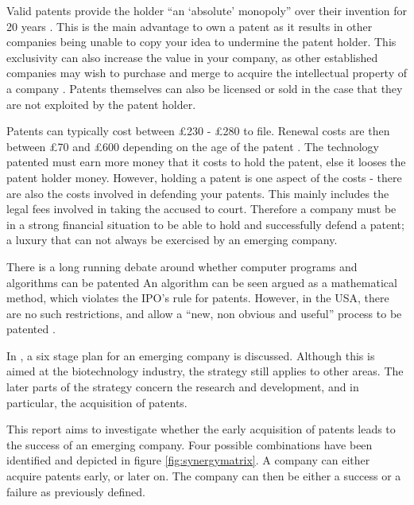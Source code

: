
Valid patents provide the holder ``an `absolute' monopoly'' over their invention for 20 years \cite{waelde2013contemporary}.
This is the main advantage to own a patent as it results in other companies being unable to copy your idea to undermine the patent holder.
This exclusivity can also increase the value in your company, as other established companies may wish to purchase and merge to acquire the intellectual property of a company \cite{NEEDED}. 
Patents themselves can also be licensed or sold in the case that they are not exploited by the patent holder. 

Patents can typically cost between \pounds 230 - \pounds 280 to file. 
Renewal costs are then between \pounds 70 and \pounds 600 depending on the age of the patent \cite{ipocosts}.
The technology patented must earn more money that it costs to hold the patent, else it looses the patent holder money.
However, holding a patent is one aspect of the costs - there are also the costs involved in defending your patents.
This mainly includes the legal fees involved in taking the accused to court. 
Therefore a company must be in a strong financial situation to be able to hold and successfully defend a patent; a luxury that can not always be exercised by an emerging company.


There is a long running debate around whether computer programs and algorithms can be patented \cite{juden2005can, klemens2005math}
An algorithm can be seen argued as a mathematical method, which violates the IPO's rule for patents.
However, in the USA, there are no such restrictions, and allow a ``new, non obvious and useful'' process to be patented \cite{usapatent}.


In \cite{zahra1996technology}, a six stage plan for an emerging company is discussed. 
Although this is aimed at the biotechnology industry, the strategy still applies to other areas. 
The later parts of the strategy concern the research and development, and in particular, the acquisition of patents. 


This report aims to investigate whether the early acquisition of patents leads to the success of an emerging company.
Four possible combinations have been identified and depicted in figure \ref{fig:synergymatrix}. 
A company can either acquire patents early, or later on. 
The company can then be either a success or a failure as previously defined.

